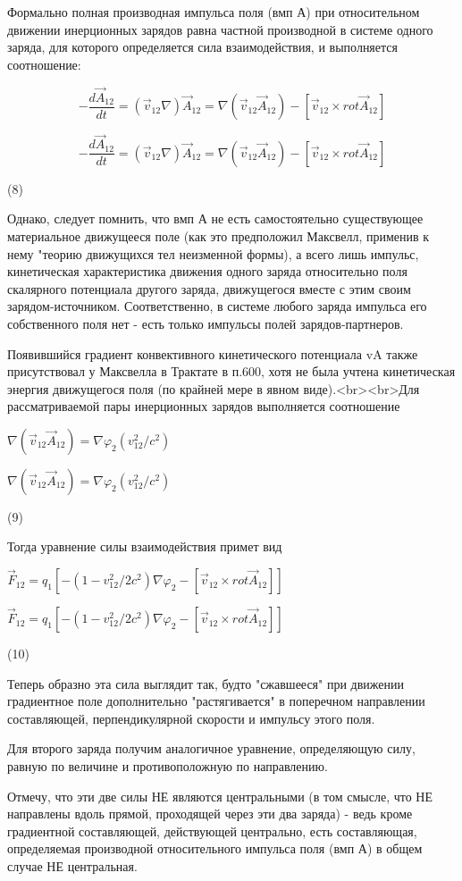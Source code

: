 \documentclass{article}
\begin{document}
Формально полная производная импульса поля (вмп А) при относительном движении инерционных зарядов равна частной производной в системе одного заряда, для которого определяется сила взаимодействия, и выполняется соотношение:

$$-\frac{d\vec A_{12}}{dt}=(\vec v_{12}\nabla)\vec A_{12}=\nabla(\vec v_{12}\vec A_{12})-[\vec v_{12}\times rot\vec A_{12}]$$

$$-\frac{d\vec A_{12}}{dt}=(\vec v_{12}\nabla)\vec A_{12}=\nabla(\vec v_{12}\vec A_{12})-[\vec v_{12}\times rot\vec A_{12}]$$

(8)

Однако, следует помнить, что вмп А не есть самостоятельно существующее материальное движущееся поле (как это предположил Максвелл, применив к нему "теорию движущихся тел неизменной формы), а всего лишь импульс, кинетическая характеристика движения одного заряда относительно поля скалярного потенциала другого заряда, движущегося вместе с этим своим зарядом-источником. Соответственно, в системе любого заряда импульса его собственного поля нет - есть только импульсы полей зарядов-партнеров.

Появившийся градиент конвективного кинетического потенциала vA также присутствовал у Максвелла в Трактате в п.600, хотя не была учтена кинетическая энергия движущегося поля (по крайней мере в явном виде).<br><br>Для рассматриваемой пары инерционных зарядов выполняется соотношение

$\nabla(\vec v_{12}\vec A_{12})=\nabla\varphi_2 (v_{12}^2/c^2)$

$\nabla(\vec v_{12}\vec A_{12})=\nabla\varphi_2 (v_{12}^2/c^2)$

(9)

Тогда уравнение силы взаимодействия примет вид

$\vec F_{12}=q_1 [-(1- v_{12}^2/2c^2)\nabla\varphi_2-[\vec v_{12}\times rot\vec A_{12}]]$

$\vec F_{12}=q_1 [-(1- v_{12}^2/2c^2)\nabla\varphi_2-[\vec v_{12}\times rot\vec A_{12}]]$

(10)

Теперь образно эта сила выглядит так, будто "сжавшееся" при движении градиентное поле дополнительно "растягивается" в поперечном направлении составляющей, перпендикулярной скорости и импульсу этого поля.

Для второго заряда получим аналогичное уравнение, определяющую силу, равную по величине и противоположную по направлению.

Отмечу, что эти две силы НЕ являются центральными (в том смысле, что НЕ направлены вдоль прямой, проходящей через эти два заряда) - ведь кроме градиентной составляющей, действующей центрально, есть составляющая, определяемая производной относительного импульса поля (вмп А) в общем случае НЕ центральная.
\end{document}
